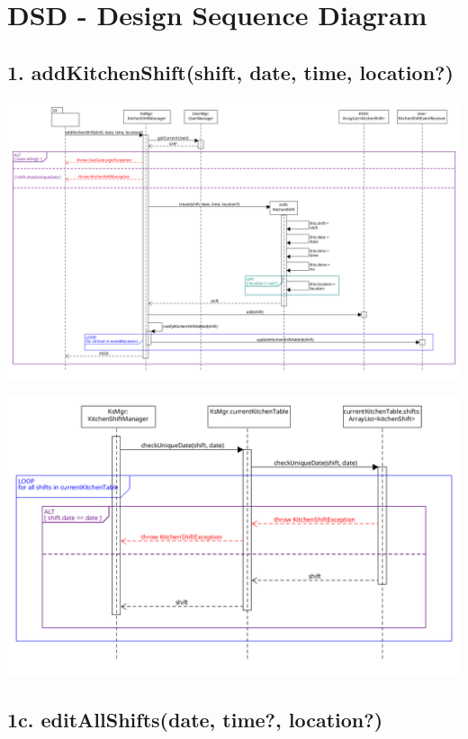 \chapter{DSD - Design Sequence Diagram}

\section*{1. addKitchenShift(shift, date, time, location?)}

\begin{center}
  \includegraphics[scale = 0.3]{images/DSD/Esame DSD 1.png}
\end{center}

\begin{center}
  \includegraphics[scale = 0.4]{images/DSD/Esame DSD 1 Extra.png}  
\end{center}

\pagebreak

\section*{1c. editAllShifts(date, time?, location?)}

